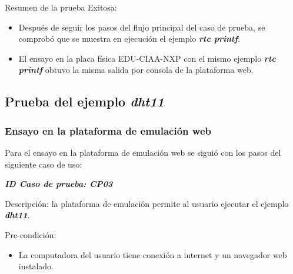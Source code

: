 Resumen de la prueba Exitosa:
\begin{itemize}
	\item Después de seguir los pasos del flujo principal del caso de prueba, se comprobó que se muestra en ejecución el ejemplo \textit{\textbf{rtc printf}}.
	\item El ensayo en la placa física EDU-CIAA-NXP  con el mismo ejemplo \textit{\textbf{rtc printf}} obtuvo la misma salida por consola de la plataforma web.

\end{itemize}


\subsection{Prueba del ejemplo \textit{\textbf{dht11}} }

\subsubsection{Ensayo en la plataforma de emulación web} 
Para el ensayo en la plataforma de emulación web se siguió con los pasos del siguiente caso de uso:

\textit{\textbf{ID Caso de prueba: CP03}}

Descripción: la plataforma de emulación permite al usuario ejecutar el ejemplo \textit{\textbf{dht11}}.

Pre-condición: 
\begin{itemize}
	\item La computadora del usuario tiene conexión a internet y un navegador web instalado.
\end{itemize}

